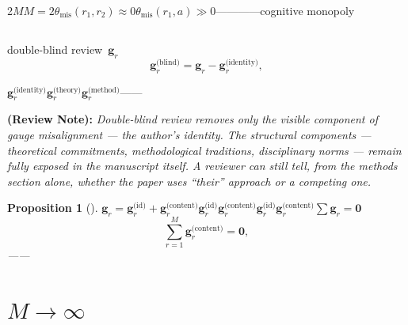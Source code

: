 \documentclass[12pt,a4paper]{article}
\newtheorem{proposition}[theorem]{Proposition}
\theoremstyle{remark}
\newcommand{\gaugeVec}{\mathbf{g}}
\newcommand{\misalignAngle}{\theta_{\text{mis}}}
\newcommand{\reviewnote}[1]{%
    \medskip\noindent
    \textbf{ (Review Note):} \textit{#1}%
}
\begin{document}
\begin{honestcrit}{2$M$$M=2$$\misalignAngle(r_1, r_2) \approx 0$$\misalignAngle(r_1, a) \gg 0$\textit{}————\textbf{}cognitive monopoly}
\end{honestcrit}

\subsection{}

double-blind review~\cite{snodgrass2006single}$\gaugeVec_r$\textbf{}
\begin{equation}
    \gaugeVec_r^{\text{(blind)}} = \gaugeVec_r - \gaugeVec_r^{\text{(identity)}},
    \label{eq:blind_gauge}
\end{equation}


$\gaugeVec_r^{\text{(identity)}}$$\gaugeVec_r^{\text{(theory)}}$$\gaugeVec_r^{\text{(method)}}$——\textbf{}

\reviewnote{Double-blind review removes only the \textit{visible} component of gauge misalignment — the author's identity. The \textit{structural} components — theoretical commitments, methodological traditions, disciplinary norms — remain fully exposed in the manuscript itself. A reviewer can still tell, from the methods section alone, whether the paper uses ``their'' approach or a competing one.}

\begin{proposition}[]
\label{prop:double_blind}
$\gaugeVec_r = \gaugeVec_r^{\text{(id)}} + \gaugeVec_r^{\text{(content)}}$$\gaugeVec_r^{\text{(id)}}$$\gaugeVec_r^{\text{(content)}}$$\gaugeVec_r^{\text{(id)}}$$\gaugeVec_r^{\text{(content)}}$$\sum \gaugeVec_r = \mathbf{0}$
\begin{equation}
    \sum_{r=1}^{M} \gaugeVec_r^{\text{(content)}} = \mathbf{0},
    \label{eq:blind_gauge_condition}
\end{equation}
\textbf{}——
\end{proposition}

\section{$M \to \infty$}
\label{sec:open_science}

\subsection{}
\end{document}
